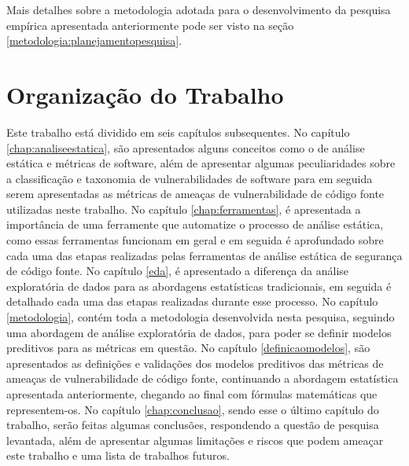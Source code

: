 Mais detalhes sobre a metodologia adotada para o desenvolvimento da pesquisa
empírica apresentada anteriormente pode ser visto na seção
\ref{metodologia:planejamentopesquisa}.

\section{Organização do Trabalho}

Este trabalho está dividido em seis capítulos subsequentes. No capítulo
\ref{chap:analiseestatica}, são apresentados alguns conceitos como o de análise
estática e métricas de software, além de apresentar algumas peculiaridades sobre
a classificação e taxonomia de vulnerabilidades de software para em seguida
serem apresentadas as métricas de ameaças de vulnerabilidade de código fonte
utilizadas neste trabalho. No capítulo \ref{chap:ferramentas}, é apresentada a
importância de uma ferramente que automatize o processo de análise estática,
como essas ferramentas funcionam em geral e em seguida é aprofundado sobre cada
uma das etapas realizadas pelas ferramentas de análise estática de segurança de
código fonte. No capítulo \ref{eda}, é apresentado a diferença da análise
exploratória de dados para as abordagens estatísticas tradicionais, em seguida é
detalhado cada uma das etapas realizadas durante esse processo. No capítulo
\ref{metodologia}, contém toda a metodologia desenvolvida nesta pesquisa,
seguindo uma abordagem de análise exploratória de dados, para poder se definir
modelos preditivos para as métricas em questão. No capítulo
\ref{definicaomodelos}, são apresentados as definições e validações dos modelos
preditivos das métricas de ameaças de vulnerabilidade de código fonte,
continuando a abordagem estatística apresentada anteriormente, chegando ao final
com fórmulas matemáticas que representem-os. No capítulo \ref{chap:conclusao},
sendo esse o último capítulo do trabalho, serão feitas algumas conclusões,
respondendo a questão de pesquisa levantada, além de apresentar algumas
limitações e riscos que podem ameaçar este trabalho e uma lista de trabalhos
futuros.


